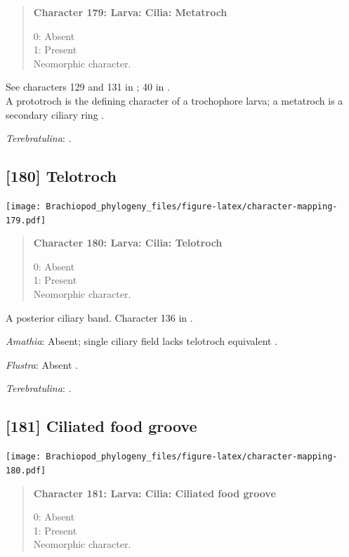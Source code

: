 \documentclass[openany]{book}
\begin{document}
\begin{quote}
\textbf{Character 179: Larva: Cilia: Metatroch}

0: Absent\\
1: Present\\
Neomorphic character.
\end{quote}

See characters 129 and 131 in \citet{Rouse1999}; 40 in
\citet{Haszprunar1996}.\\
A prototroch is the defining character of a trochophore larva; a
metatroch is a secondary ciliary ring \citep{Rouse1999}.

\hypertarget{Terebratulina-coding-179}{}
\emph{Terebratulina}: \citet{Williams1997Introduction}.

\subsection*{{[}180{]} Telotroch}\label{telotroch}

\texttt{[image: Brachiopod\_phylogeny\_files/figure-latex/character-mapping-179.pdf]}

\begin{quote}
\textbf{Character 180: Larva: Cilia: Telotroch}

0: Absent\\
1: Present\\
Neomorphic character.
\end{quote}

A posterior ciliary band. Character 136 in \citet{Rouse1999}.

\hypertarget{Amathia-coding-180}{}
\emph{Amathia}: Absent; single ciliary field lacks telotroch equivalent
\citep{Reed1982}.

\hypertarget{Flustra-coding-180}{}
\emph{Flustra}: Absent \citep{Zimmer2013}.

\hypertarget{Terebratulina-coding-180}{}
\emph{Terebratulina}: \citet{Williams1997Introduction}.

\subsection*{{[}181{]} Ciliated food groove}\label{ciliated-food-groove}

\texttt{[image: Brachiopod\_phylogeny\_files/figure-latex/character-mapping-180.pdf]}

\begin{quote}
\textbf{Character 181: Larva: Cilia: Ciliated food groove}

0: Absent\\
1: Present\\
Neomorphic character.
\end{quote}
\end{document}
